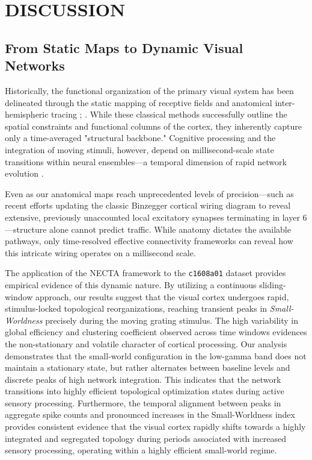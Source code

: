 \chapter{DISCUSSION}

\section{From Static Maps to Dynamic Visual Networks}
Historically, the functional organization of the primary visual system has been delineated through the static mapping of receptive fields and anatomical inter-hemispheric tracing \cite{wunderle2013}; \cite{schmidt2023}. While these classical methods successfully outline the spatial constraints and functional columns of the cortex, they inherently capture only a time-averaged "structural backbone." Cognitive processing and the integration of moving stimuli, however, depend on millisecond-scale state transitions within neural ensembles—a temporal dimension of rapid network evolution \cite{kopell2014}. 

Even as our anatomical maps reach unprecedented levels of precision---such as recent efforts updating the classic Binzegger cortical wiring diagram to reveal extensive, previously unaccounted local excitatory synapses terminating in layer 6 \cite{Martin_2024}---structure alone cannot predict traffic. While anatomy dictates the available pathways, only time-resolved effective connectivity frameworks can reveal how this intricate wiring operates on a millisecond scale.

The application of the NECTA framework to the \texttt{c1608a01} dataset provides empirical evidence of this dynamic nature. By utilizing a continuous sliding-window approach, our results suggest that the visual cortex undergoes rapid, stimulus-locked topological reorganizations, reaching transient peaks in \textit{Small-Worldness} precisely during the moving grating stimulus. The high variability in global efficiency and clustering coefficient observed across time windows evidences the non-stationary and volatile character of cortical processing. Our analysis demonstrates that the small-world configuration in the low-gamma band does not maintain a stationary state, but rather alternates between baseline levels and discrete peaks of high network integration. This indicates that the network transitions into highly efficient topological optimization states during active sensory processing. Furthermore, the temporal alignment between peaks in aggregate spike counts and pronounced increases in the Small-Worldness index provides consistent evidence that the visual cortex rapidly shifts towards a highly integrated and segregated topology during periods associated with increased sensory processing, operating within a highly efficient small-world regime.

